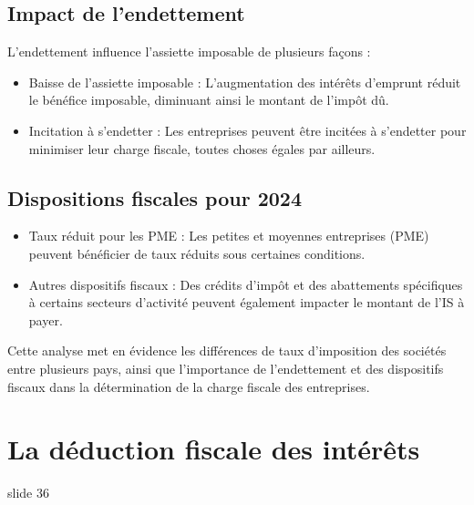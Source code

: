 \documentclass[a4paper, 12pt]{report}
\begin{document}
\subsection{Impact de l'endettement}
L'endettement influence l'assiette imposable de plusieurs façons :
\begin{itemize}
	\item Baisse de l'assiette imposable : L'augmentation des intérêts d'emprunt réduit le bénéfice imposable, diminuant ainsi le montant de l'impôt dû.
	\item Incitation à s'endetter : Les entreprises peuvent être incitées à s'endetter pour minimiser leur charge fiscale, toutes choses égales par ailleurs.
\end{itemize}

\subsection{Dispositions fiscales pour 2024}
\begin{itemize}
	\item Taux réduit pour les PME : Les petites et moyennes entreprises (PME) peuvent bénéficier de taux réduits sous certaines conditions.
	\item Autres dispositifs fiscaux : Des crédits d'impôt et des abattements spécifiques à certains secteurs d'activité peuvent également impacter le montant de l'IS à payer.
\end{itemize}

Cette analyse met en évidence les différences de taux d'imposition des sociétés entre plusieurs pays, ainsi que l'importance de l'endettement et des dispositifs fiscaux dans la détermination de la charge fiscale des entreprises.

\section{La déduction fiscale des intérêts} slide 36
\end{document}
